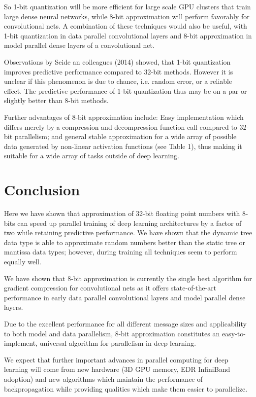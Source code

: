 \documentclass{article} %
\begin{document}
So 1-bit quantization will be more efficient for large scale GPU clusters that train large dense neural networks, while 8-bit approximation will perform favorably for convolutional nets. A combination of these techniques would also be useful, with 1-bit quantization in data parallel convolutional layers and 8-bit approximation in model parallel dense layers of a convolutional net. 

Observations by Seide an colleagues (2014) showed, that 1-bit quantization improves predictive performance compared to 32-bit methods. However it is unclear if this phenomenon is due to chance, i.e. random error, or a reliable effect. The predictive performance of 1-bit quantization thus may be on a par or slightly better than 8-bit methods.

Further advantages of 8-bit approximation include: Easy implementation which differs merely by a compression and decompression function call compared to 32-bit parallelism; and general stable approximation for a wide array of possible data generated by non-linear activation functions (see Table 1), thus making it suitable for a wide array of tasks outside of deep learning.

\section*{Conclusion}

Here we have shown that approximation of 32-bit floating point numbers with 8-bits can speed up parallel training of deep learning architectures by a factor of two while retaining predictive performance. We have shown that the dynamic tree data type is able to approximate random numbers better than the static tree or mantissa data types; however, during training all techniques seem to perform equally well.

We have shown that 8-bit approximation is currently the single best algorithm for gradient compression for convolutional nets as it offers state-of-the-art performance in early data parallel convolutional layers and model parallel dense layers. 

Due to the excellent performance for all different message sizes and applicability to both model and data parallelism, 8-bit approximation constitutes an easy-to-implement, universal algorithm for parallelism in deep learning.

We expect that further important advances in parallel computing for deep learning will come from new hardware (3D GPU memory, EDR InfiniBand adoption) and new algorithms which maintain the performance of backpropagation while providing qualities which make them easier to parallelize. 
\end{document}
